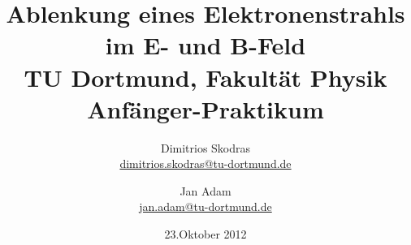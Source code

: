 



\title{Ablenkung eines Elektronenstrahls im E- und B-Feld\\				%
\large TU Dortmund, Fakultät Physik\\ 
\normalsize Anfänger-Praktikum}

\author{Dimitrios Skodras\\			%
{\small \href{dimitrios.skodras@tu-dortmund.de}{dimitrios.skodras@tu-dortmund.de}}	%
\and						%
Jan Adam\\					%
{\small \href{jan.adam@tu-dortmund.de}{jan.adam@tu-dortmund.de}}		%
}
\date{23.Oktober 2012}				%





\maketitle					%

\thispagestyle{empty} 				%


\tableofcontents


\newpage					%


